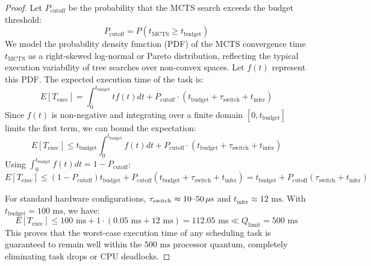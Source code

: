 \documentclass[11pt,a4paper]{book}
\begin{document}
\begin{proof}
Let $P_{\text{cutoff}}$ be the probability that the MCTS search exceeds the budget threshold:
\begin{equation}
\label{eq:probability_cutoff}
P_{\text{cutoff}} = P(t_{\text{MCTS}} \ge t_{\text{budget}})
\end{equation}
We model the probability density function (PDF) of the MCTS convergence time $t_{\text{MCTS}} $ as a right-skewed log-normal or Pareto distribution, reflecting the typical execution variability of tree searches over non-convex spaces. Let $f(t)$ represent this PDF. The expected execution time of the task is:
\begin{equation}
\label{eq:expected_exec}
E[T_{\text{exec}}] = \int_{0}^{t_{\text{budget}}} t f(t) dt + P_{\text{cutoff}} \cdot (t_{\text{budget}} + \tau_{\text{switch}} + t_{\text{infer}})
\end{equation}
Since $f(t)$ is non-negative and integrating over a finite domain $[0, t_{\text{budget}}]$ limits the first term, we can bound the expectation:
\begin{equation}
\label{eq:expectation_bound}
E[T_{\text{exec}}] \le t_{\text{budget}} \int_{0}^{t_{\text{budget}}} f(t) dt + P_{\text{cutoff}} \cdot (t_{\text{budget}} + \tau_{\text{switch}} + t_{\text{infer}})
\end{equation}
Using $\int_{0}^{t_{\text{budget}}} f(t) dt = 1 - P_{\text{cutoff}}$:
\begin{equation}
\label{eq:expectation_bound_clean}
E[T_{\text{exec}}] \le (1 - P_{\text{cutoff}}) t_{\text{budget}} + P_{\text{cutoff}} (t_{\text{budget}} + \tau_{\text{switch}} + t_{\text{infer}}) = t_{\text{budget}} + P_{\text{cutoff}}(\tau_{\text{switch}} + t_{\text{infer}})
\end{equation}

For standard hardware configurations, $\tau_{\text{switch}} \approx 10\text{--}50\thinspace \mu\text{s}$ and $t_{\text{infer}} \approx 12\text{ ms}$. With $t_{\text{budget}} = 100\text{ ms}$, we have:
\begin{equation}
\label{eq:quantum_compliance}
E[T_{\text{exec}}] \le 100\text{ ms} + 1 \cdot (0.05\text{ ms} + 12\text{ ms}) = 112.05\text{ ms} \ll Q_{\text{limit}} = 500\text{ ms}
\end{equation}
This proves that the worst-case execution time of any scheduling task is guaranteed to remain well within the $500\text{ ms}$ processor quantum, completely eliminating task drops or CPU deadlocks.


\end{proof}
\end{document}
